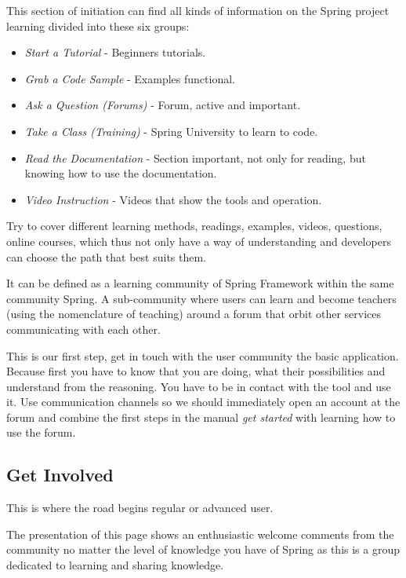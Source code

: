 \documentclass[11pt]{scrartcl}
\begin{document}
This section of initiation can find all kinds of information on the Spring project learning divided into these six groups:

\begin{itemize}
    \item \emph{Start a Tutorial} - Beginners tutorials.
    \item \emph{Grab a Code Sample} - Examples functional.
    \item \emph{Ask a Question (Forums)} - Forum, active and important.
    \item \emph{Take a Class (Training)} - Spring University to learn to code.
    \item \emph{Read the Documentation} - Section important, not only for reading, but knowing how to use the documentation.
    \item \emph{Video Instruction} - Videos that show the tools and operation.
\end{itemize}

\par Try to cover different learning methods, readings, examples, videos, questions, online courses, which thus not only have a way of understanding and developers can choose the path that best suits them.

\par It can be defined as a learning community of Spring Framework within the same community Spring. A sub-community where users can learn and become teachers (using the nomenclature of teaching) around a forum that orbit other services communicating with each other.

\par This is our first step, get in touch with the user community the basic application. Because first you have to know that you are doing, what their possibilities and understand from the reasoning. You have to be in contact with the tool and use it. Use communication channels so we should immediately open an account at the forum and combine the first steps in the manual \emph{get started} with learning how to use the forum.

\subsection{Get Involved}

\par This is where the road begins regular or advanced user.

\par The presentation of this page shows an enthusiastic welcome comments from the community no matter the level of knowledge you have of Spring as this is a group dedicated to learning and sharing knowledge.
\end{document}
